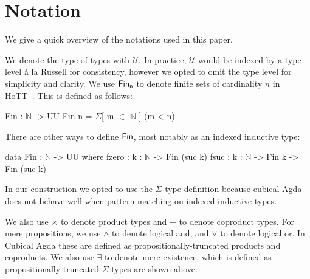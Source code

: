 \section{Notation}\label{sec:notation}
We give a quick overview of the notations used in this paper.

We denote the type of types with $\mathcal{U}$. 
In practice, $\mathcal{U}$ would be indexed by a type level 
à la Russell for consistency, however we opted to omit the type level
for simplicity and clarity.
We use $\Fin[n]$ to denote finite sets of cardinality $n$ in HoTT~\cite{yorgeyCombinatorialSpeciesLabelled2014a}.
This is defined as follows:

\begin{code}
Fin : $\mathbb{N}$ -> UU
Fin n = $\Sigma$[ m $\in$ $\mathbb{N}$ ] (m < n)
\end{code}

There are other ways to define $\Fin$, most notably as an indexed inductive type:
\begin{code}
data Fin : $\mathbb{N}$ -> UU where
    fzero : {k : $\mathbb{N}$} -> Fin (suc k)
    fsuc : {k : $\mathbb{N}$} -> Fin k -> Fin (suc k)
\end{code}


In our construction we opted to use the $\Sigma$-type definition
because cubical Agda does not behave well
when pattern matching on indexed inductive types.

We also use $\times$ to denote product types and $+$ to denote coproduct types.
For mere propositions, we use $\land$ to denote logical and, and $\vee$ to denote logical or.
In Cubical Agda these are defined as propositionally-truncated products and coproducts.
We also use $\exists$ to denote mere existence, which is defined as
propositionally-truncated $\Sigma$-types are shown above.
